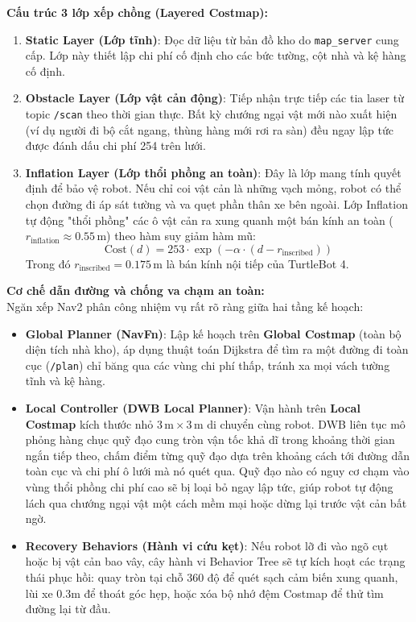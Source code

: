\documentclass[12pt, a4paper]{article}
\begin{document}
\textbf{Cấu trúc 3 lớp xếp chồng (Layered Costmap):}
\begin{enumerate}
    \item \textbf{Static Layer (Lớp tĩnh)}: Đọc dữ liệu từ bản đồ kho do \texttt{map\_server} cung cấp. Lớp này thiết lập chi phí cố định cho các bức tường, cột nhà và kệ hàng cố định.
    \item \textbf{Obstacle Layer (Lớp vật cản động)}: Tiếp nhận trực tiếp các tia laser từ topic \texttt{/scan} theo thời gian thực. Bất kỳ chướng ngại vật mới nào xuất hiện (ví dụ người đi bộ cắt ngang, thùng hàng mới rơi ra sàn) đều ngay lập tức được đánh dấu chi phí 254 trên lưới.
    \item \textbf{Inflation Layer (Lớp thổi phồng an toàn)}: Đây là lớp mang tính quyết định để bảo vệ robot. Nếu chỉ coi vật cản là những vạch mỏng, robot có thể chọn đường đi áp sát tường và va quẹt phần thân xe bên ngoài. Lớp Inflation tự động "thổi phồng" các ô vật cản ra xung quanh một bán kính an toàn ($r_{\text{inflation}} \approx 0.55\,\text{m}$) theo hàm suy giảm hàm mũ:
    $$\text{Cost}(d) = 253 \cdot \exp\left(-\alpha \cdot (d - r_{\text{inscribed}})\right)$$
    Trong đó $r_{\text{inscribed}} = 0.175\,\text{m}$ là bán kính nội tiếp của TurtleBot 4.
\end{enumerate}

\textbf{Cơ chế dẫn đường và chống va chạm an toàn:}\\
Ngăn xếp Nav2 phân công nhiệm vụ rất rõ ràng giữa hai tầng kế hoạch:
\begin{itemize}
    \item \textbf{Global Planner (NavFn)}: Lập kế hoạch trên \textbf{Global Costmap} (toàn bộ diện tích nhà kho), áp dụng thuật toán Dijkstra để tìm ra một đường đi toàn cục (\texttt{/plan}) chỉ băng qua các vùng chi phí thấp, tránh xa mọi vách tường tĩnh và kệ hàng.
    \item \textbf{Local Controller (DWB Local Planner)}: Vận hành trên \textbf{Local Costmap} kích thước nhỏ $3\,\text{m} \times 3\,\text{m}$ di chuyển cùng robot. DWB liên tục mô phỏng hàng chục quỹ đạo cung tròn vận tốc khả dĩ trong khoảng thời gian ngắn tiếp theo, chấm điểm từng quỹ đạo dựa trên khoảng cách tới đường dẫn toàn cục và chi phí ô lưới mà nó quét qua. Quỹ đạo nào có nguy cơ chạm vào vùng thổi phồng chi phí cao sẽ bị loại bỏ ngay lập tức, giúp robot tự động lách qua chướng ngại vật một cách mềm mại hoặc dừng lại trước vật cản bất ngờ.
    \item \textbf{Recovery Behaviors (Hành vi cứu kẹt)}: Nếu robot lỡ đi vào ngõ cụt hoặc bị vật cản bao vây, cây hành vi Behavior Tree sẽ tự kích hoạt các trạng thái phục hồi: quay tròn tại chỗ 360 độ để quét sạch cảm biến xung quanh, lùi xe 0.3m để thoát góc hẹp, hoặc xóa bộ nhớ đệm Costmap để thử tìm đường lại từ đầu.
\end{itemize}
\end{document}
